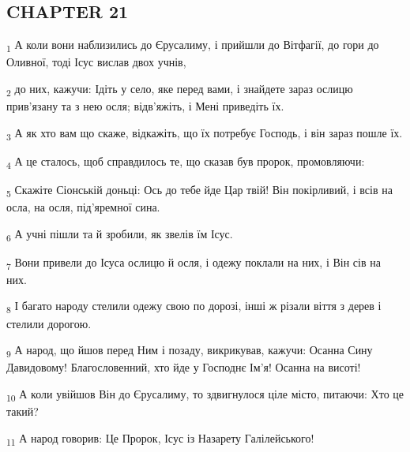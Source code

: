 \subsection{CHAPTER 21}
\begin{tcolorbox}
\textsubscript{1} А коли вони наблизились до Єрусалиму, і прийшли до Вітфагії, до гори до Оливної, тоді Ісус вислав двох учнів,
\end{tcolorbox}
\begin{tcolorbox}
\textsubscript{2} до них, кажучи: Ідіть у село, яке перед вами, і знайдете зараз ослицю прив'язану та з нею осля; відв'яжіть, і Мені приведіть їх.
\end{tcolorbox}
\begin{tcolorbox}
\textsubscript{3} А як хто вам що скаже, відкажіть, що їх потребує Господь, і він зараз пошле їх.
\end{tcolorbox}
\begin{tcolorbox}
\textsubscript{4} А це сталось, щоб справдилось те, що сказав був пророк, промовляючи:
\end{tcolorbox}
\begin{tcolorbox}
\textsubscript{5} Скажіте Сіонській доньці: Ось до тебе йде Цар твій! Він покірливий, і всів на осла, на осля, під'яремної сина.
\end{tcolorbox}
\begin{tcolorbox}
\textsubscript{6} А учні пішли та й зробили, як звелів їм Ісус.
\end{tcolorbox}
\begin{tcolorbox}
\textsubscript{7} Вони привели до Ісуса ослицю й осля, і одежу поклали на них, і Він сів на них.
\end{tcolorbox}
\begin{tcolorbox}
\textsubscript{8} І багато народу стелили одежу свою по дорозі, інші ж різали віття з дерев і стелили дорогою.
\end{tcolorbox}
\begin{tcolorbox}
\textsubscript{9} А народ, що йшов перед Ним і позаду, викрикував, кажучи: Осанна Сину Давидовому! Благословенний, хто йде у Господнє Ім'я! Осанна на висоті!
\end{tcolorbox}
\begin{tcolorbox}
\textsubscript{10} А коли увійшов Він до Єрусалиму, то здвигнулося ціле місто, питаючи: Хто це такий?
\end{tcolorbox}
\begin{tcolorbox}
\textsubscript{11} А народ говорив: Це Пророк, Ісус із Назарету Галілейського!
\end{tcolorbox}
